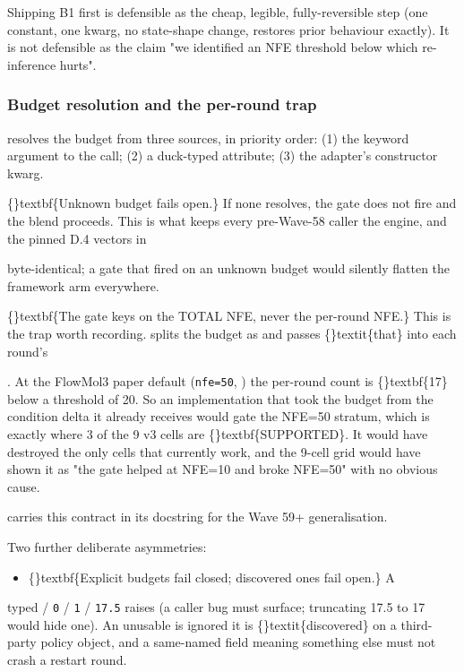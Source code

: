 \documentclass{article}
\begin{document}
Shipping B1 first is defensible as the cheap, legible, fully-reversible step (one constant, one kwarg, no state-shape change,  restores prior behaviour exactly). It is not defensible as the claim "we identified an NFE threshold below which re-inference hurts".

\subsubsection{Budget resolution  and the per-round trap}
 resolves the budget from three sources, in priority order: (1) the  keyword argument to the call; (2) a duck-typed  attribute; (3) the adapter's  constructor kwarg.

\{\}textbf\{Unknown budget fails open.\} If none resolves, the gate does not fire and the blend proceeds. This is what keeps every pre-Wave-58 caller  the engine, and the pinned D.4 vectors in

  byte-identical; a gate that fired on an unknown budget would silently flatten the framework arm everywhere.

\{\}textbf\{The gate keys on the TOTAL NFE, never the per-round NFE.\} This is the trap worth recording.  splits the budget as  and passes \{\}textit\{that\} into each round's

. At the FlowMol3 paper default (\texttt{nfe=50}, ) the per-round count is \{\}textbf\{17\}  below a threshold of 20. So an implementation that took the budget from the condition delta it already receives would gate the NFE=50 stratum, which is exactly where 3 of the 9 v3 cells are \{\}textbf\{SUPPORTED\}. It would have destroyed the only cells that currently work, and the 9-cell grid would have shown it as "the gate helped at NFE=10 and broke NFE=50" with no obvious cause.

 carries this contract in its docstring for the Wave 59+ generalisation.

Two further deliberate asymmetries:

\begin{itemize}
\item \{\}textbf\{Explicit budgets fail closed; discovered ones fail open.\} A
\end{itemize}
typed  / \texttt{0} / \texttt{1} / \texttt{17.5} raises (a caller bug must surface; truncating 17.5 to 17 would hide one). An unusable  is ignored  it is \{\}textit\{discovered\} on a third-party policy object, and a same-named field meaning something else must not crash a restart round.
\end{document}
